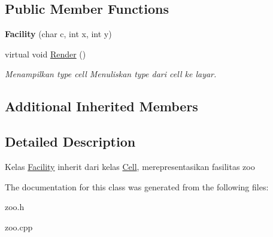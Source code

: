 \subsection*{Public Member Functions}
\begin{DoxyCompactItemize}
\item 
{\bfseries Facility} (char c, int x, int y)\hypertarget{classFacility_a33629884ce928c0d32ffd0509542af6f}{}\label{classFacility_a33629884ce928c0d32ffd0509542af6f}

\item 
virtual void \hyperlink{classFacility_a56a6c8fe31e61ca176db745931d5255b}{Render} ()\hypertarget{classFacility_a56a6c8fe31e61ca176db745931d5255b}{}\label{classFacility_a56a6c8fe31e61ca176db745931d5255b}

\begin{DoxyCompactList}\small\item\em Menampilkan type cell Menuliskan type dari cell ke layar. \end{DoxyCompactList}\end{DoxyCompactItemize}
\subsection*{Additional Inherited Members}


\subsection{Detailed Description}
Kelas \hyperlink{classFacility}{Facility} inherit dari kelas \hyperlink{classCell}{Cell}, merepresentasikan fasilitas zoo 

The documentation for this class was generated from the following files\+:\begin{DoxyCompactItemize}
\item 
zoo.\+h\item 
zoo.\+cpp\end{DoxyCompactItemize}
